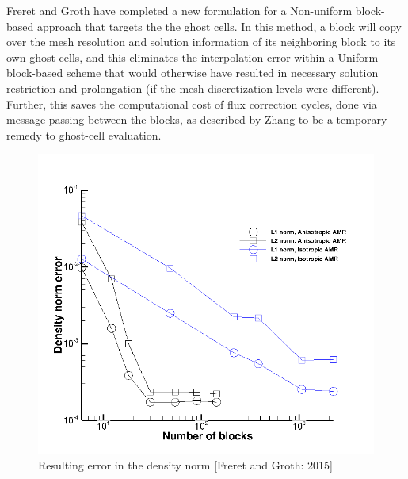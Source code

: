 Freret and Groth \cite{Freret:2015} have completed a new formulation for a Non-uniform block-based approach that targets the the ghost cells. In this method, a block will copy over the mesh resolution and solution information of its neighboring block to its own ghost cells, and this eliminates the interpolation error within a Uniform block-based scheme that would otherwise have resulted in necessary solution restriction and prolongation (if the mesh discretization levels were different). Further, this saves the computational cost of flux correction cycles, done via message passing between the blocks, as described by Zhang to be a temporary remedy to ghost-cell evaluation.\cite{zhang:2011b}


\begin{figure}
    \vspace{0.2cm}
    \begin{center}
      \includegraphics[height=0.5\textwidth]{./figs/outflowError.png}
    \end{center}
    \caption{Resulting error in the density norm [Freret and Groth: 2015] \cite{Freret:2015}}  
    \vspace{0.2cm}
    \label{fig:outErr}
\end{figure}
